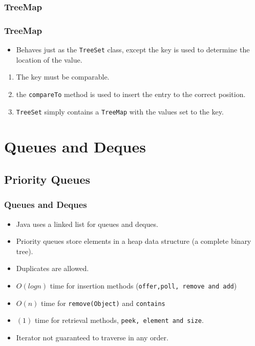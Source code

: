 \documentclass{beamer}
\begin{document}
\subsubsection{TreeMap}
\begin{frame}
\frametitle{TreeMap}
\begin{itemize}
\item Behaves just as the \texttt{TreeSet} class, except the key is used to determine the location of the value.
\end{itemize}
\begin{enumerate}
\item The key must be comparable.
\item the \texttt{compareTo} method is used to insert the entry to the correct position.
\item \texttt{TreeSet} simply contains a \texttt{TreeMap} with the values set to the key. 
\end{enumerate}
\end{frame}
\section{Queues and Deques}
\subsection{Priority Queues}
\begin{frame}
\frametitle{Queues and Deques}
\begin{itemize}
\item Java uses a {\color{green}linked list} for queues and deques.
\item Priority queues store elements in a {\color{red}heap} data structure (a complete binary tree).
\item Duplicates are allowed.
\item $O(logn)$ time for insertion methods (\texttt{offer,poll, remove and add})
\item $O(n)$ time for \texttt{remove(Object)} and \texttt{contains}
\item $(1)$ time for retrieval methods, \texttt{peek, element and size}.
\item Iterator not guaranteed to traverse in any order.
\end{itemize}
\end{frame}
\end{document}
